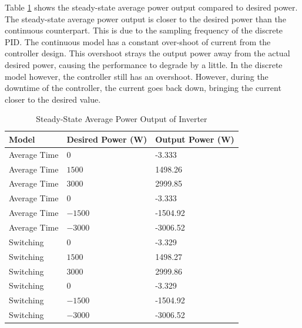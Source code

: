 \documentclass[12pt]{article}
\begin{document}
Table \ref{tab:z-c-transient} shows the steady-state average power output compared to desired power.
The steady-state average power output is closer to the desired power than the continuous counterpart.
This is due to the sampling frequency of the discrete PID.
The continuous model has a constant over-shoot of current from the controller design.
This overshoot strays the output power away from the actual desired power, causing the performance to degrade by a little.
In the discrete model however, the controller still has an overshoot.
However, during the downtime of the controller, the current goes back down, bringing the current closer to the desired value.

\begin{table}[ht]
    \caption{Steady-State Average Power Output of Inverter}
    \label{tab:z-c-transient}
    \centering{}
    \begin{tabular}{ l l l }
        \hline
        Model        & Desired Power (W) & Output Power (W) \\
        \hline
        Average Time & $0$               & -3.333           \\
        Average Time & $1500$            & 1498.26          \\
        Average Time & $3000$            & 2999.85          \\
        \hline
        Average Time & $0$               & -3.333           \\
        Average Time & $-1500$           & -1504.92         \\
        Average Time & $-3000$           & -3006.52         \\
        \hline
        Switching    & $0$               & -3.329           \\
        Switching    & $1500$            & 1498.27          \\
        Switching    & $3000$            & 2999.86          \\
        \hline
        Switching    & $0$               & -3.329           \\
        Switching    & $-1500$           & -1504.92         \\
        Switching    & $-3000$           & -3006.52         \\
        \hline
    \end{tabular}
\end{table}
\end{document}
